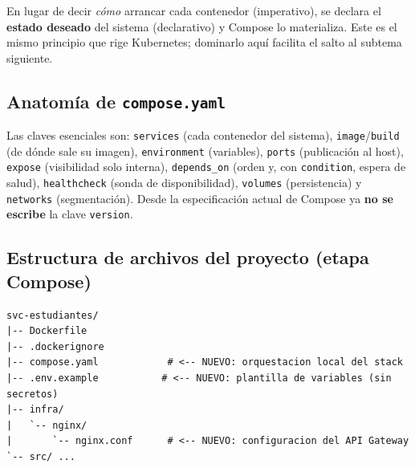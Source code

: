 \documentclass[11pt,a4paper]{article}
\begin{document}
\begin{defbox}
En lugar de decir \emph{c\'omo} arrancar cada contenedor (imperativo), se declara el \textbf{estado deseado} del sistema (declarativo) y Compose lo materializa. Este es el mismo principio que rige Kubernetes; dominarlo aqu\'i facilita el salto al subtema siguiente.
\end{defbox}

\subsection{Anatom\'ia de \texttt{compose.yaml}}

Las claves esenciales son: \texttt{services} (cada contenedor del sistema), \texttt{image}/\texttt{build} (de d\'onde sale su imagen), \texttt{environment} (variables), \texttt{ports} (publicaci\'on al host), \texttt{expose} (visibilidad solo interna), \texttt{depends\_on} (orden y, con \texttt{condition}, espera de salud), \texttt{healthcheck} (sonda de disponibilidad), \texttt{volumes} (persistencia) y \texttt{networks} (segmentaci\'on). Desde la especificaci\'on actual de Compose ya \textbf{no se escribe} la clave \texttt{version}.

\subsection{Estructura de archivos del proyecto (etapa Compose)}

\begin{lstlisting}[basicstyle=\ttfamily\footnotesize,numbers=none]
svc-estudiantes/
|-- Dockerfile
|-- .dockerignore
|-- compose.yaml            # <-- NUEVO: orquestacion local del stack
|-- .env.example           # <-- NUEVO: plantilla de variables (sin secretos)
|-- infra/
|   `-- nginx/
|       `-- nginx.conf      # <-- NUEVO: configuracion del API Gateway
`-- src/ ...
\end{lstlisting}
\end{document}
